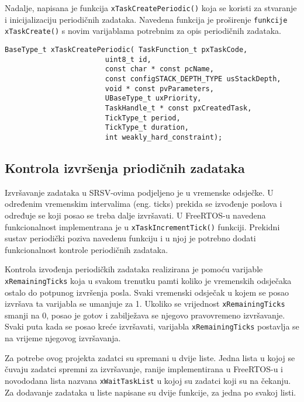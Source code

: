 \documentclass[../zavrsni.tex]{subfiles}
\begin{document}
Nadalje, napisana je funkcija \texttt{xTaskCreatePeriodic()} koja se koristi za stvaranje i inicijalizaciju periodičnih zadataka.
Navedena funkcija je proširenje \texttt{funkcije xTaskCreate()} s novim varijablama potrebnim za opis periodičnih zadataka.

\begin{lstlisting}[style=CStyle,caption={Prototip funkcije xTaskCreatePeriodic},captionpos=b]
BaseType_t xTaskCreatePeriodic( TaskFunction_t pxTaskCode,
                        uint8_t id,
                        const char * const pcName, 
                        const configSTACK_DEPTH_TYPE usStackDepth,
                        void * const pvParameters,
                        UBaseType_t uxPriority,
                        TaskHandle_t * const pxCreatedTask,
                        TickType_t period,
                        TickType_t duration,
                        int weakly_hard_constraint);
\end{lstlisting} 

\subsection{Kontrola izvršenja priodičnih zadataka}

Izvršavanje zadataka u SRSV-ovima podjeljeno je u vremenske odsječke. U određenim vremenskim intervalima (eng. ticks) prekida se izvođenje poslova i 
određuje se koji posao se treba dalje izvršavati.
U FreeRTOS-u navedena funkcionalnost implementrana je u \texttt{xTaskIncrementTick()} funkciji. Prekidni sustav periodički poziva navedenu funkciju 
i u njoj je potrebno dodati funkcionalnost kontrole periodičnih zadataka.

Kontrola izvođenja periodičkih zadataka realizirana je pomoću varijable \texttt{xRemainingTicks} koja u svakom trenutku pamti 
koliko je vremenskih odsječaka ostalo do potpunog izvršenja posla.
Svaki vremenski odsječak u kojem se posao izvršava ta varijabla se umanjuje za 1. Ukoliko se vrijednost \texttt{xRemainingTicks} smanji na 0, 
posao je gotov i zabilježava se njegovo pravovremeno izvršavanje. Svaki puta kada se posao kreće izvršavati, varijabla 
\texttt{xRemainingTicks} postavlja se na vrijeme njegovog izvršavanja.

Za potrebe ovog projekta zadatci su spremani u dvije liste. Jedna lista u kojoj se čuvaju zadatci spremni za izvršavanje, ranije 
implementirana u FreeRTOS-u i novododana lista nazvana \texttt{xWaitTaskList} u kojoj su zadatci koji su na čekanju. Za dodavanje zadataka u liste
napisane su dvije funkcije, za jedna po svakoj listi.
\end{document}
